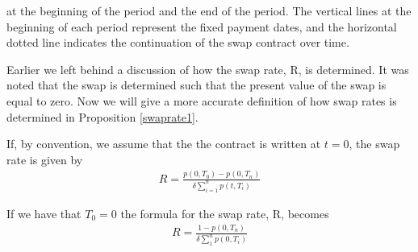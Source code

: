 at the beginning of the period and the end of the period. The vertical lines at the beginning of each period represent
the fixed payment dates, and the horizontal dotted line indicates the continuation of the swap contract over time.
\begin{center}
\end{center}
Earlier we left behind a discussion of how the swap rate, R,  is determined. 
It was noted that the swap is determined such that the present value of
the swap is equal to zero. Now we will give a more accurate definition of how swap rates is determined in Proposition \ref{swaprate1}.
\begin{proposition}
    If, by convention, we assume that the the contract is written at $t=0$, 
    the swap rate is given by \cite{Bjork}
    \begin{align*}
        R = \frac{p(0,T_0)-p(0,T_n)}{\delta \sum_{i=1}^{n}p(t,T_i)}
    \end{align*} 
    \label{swaprate1}
\end{proposition}
\noindent 
If we have that $T_0=0$ the formula for the swap rate, R, becomes
\begin{align*}
    R= \frac{1-p(0,T_n)}{\delta \sum_{1}^{n}p(0,T_i)}
\end{align*}
